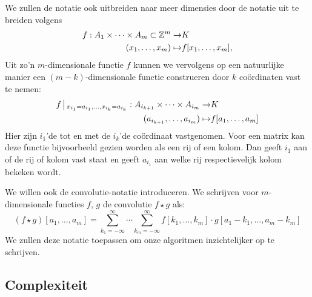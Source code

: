We zullen de notatie ook uitbreiden naar meer dimensies door de notatie uit te breiden volgens
\begin{equation*}
\begin{split}
f: A_1\times \cdots \times A_m\subset \mathbb{Z}^m \to& K \\
       (x_1,\ldots,x_m) \mapsto& f[x_1,\ldots,x_m],
\end{split}
\end{equation*}
Uit zo'n $m$-dimensionale functie $f$ kunnen we vervolgens op een natuurlijke manier een \mbox{$(m-k)$-dimensionale}
functie construeren door $k$ co\"ordinaten vast te nemen:
\begin{equation*}
\begin{split}
f\,\big|\,_{x_{i_1}=a_{i_1},\ldots,x_{i_k}=a_{i_k}}: A_{i_{k+1}}\times\cdots\times A_{i_{m}} \to& K \\
(a_{i_{k+1}},\ldots,a_{i_{m}}) \mapsto& f[a_1,\ldots,a_m]
\end{split}
\end{equation*}
Hier zijn $i_1$'de tot en met de $i_k$'de co\"ordinaat vastgenomen. Voor een matrix kan deze functie
bijvoorbeeld gezien worden als een rij of een kolom. Dan geeft $i_1$ aan of de rij of kolom
vast staat en geeft $a_{i_1}$ aan welke rij respectievelijk kolom bekeken wordt.

We willen ook de convolutie-notatie introduceren. We schrijven voor $m$-dimensionale functies $f$, $g$
de convolutie $f\star g$ als:
\[
(f\star g)[a_1,\ldots,a_m] = \sum_{k_1=-\infty}^\infty\cdots \sum_{k_m=-\infty}^\infty
f[k_1,\ldots,k_m]\cdot g[a_1-k_1,\ldots,a_m-k_m]
\]
We zullen deze notatie toepassen om onze algoritmen inzichtelijker op te schrijven.

\subsection{Complexiteit}

